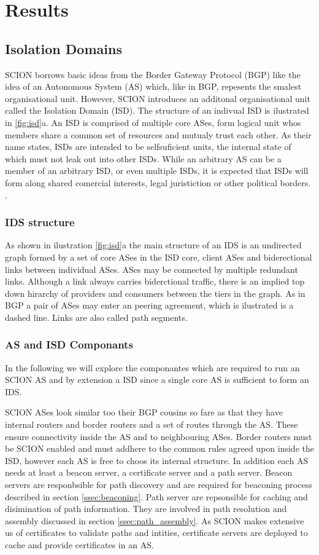 \documentclass[../eva1_scion.tex]{subfiles}
\begin{document}
    \chapter{Results}
    \section{Isolation Domains}
    SCION borrows basic ideas from the Border Gateway Protocol (BGP) like the idea of an Autonomous System (AS) which, like in BGP, repesents the smalest organisational unit. However, SCION introduces an additonal organisational unit called the Isolation Domain (ISD). The structure of an indivual ISD is ilustrated in \ref{fig:isd}a. An ISD is comprised of multiple core ASes, form logical unit whos members share a common set of resources and mutualy trust each other. As their name states, ISDs are intended to be selfsuficient units, the internal state of which must not leak out into other ISDs. \cite{scion_2011} While an arbitrary AS can be a member of an arbitrary ISD, or even multiple ISDs, it is expected that ISDs will form along shared comercial interests, legal juristiction or other political borders. \cite{scion_2017}.

    \subsection{IDS structure}
    As shown in ilustration \ref{fig:isd}a the main structure of an IDS is an undirected graph formed by a set of core ASes in the ISD core, client ASes and biderectional links between individual ASes. ASes may be connected by multiple redundant links. Although a link always carries biderctional traffic, there is an implied top down hirarchy of providers and consumers between the tiers in the graph. As in BGP a pair of ASes may enter an peering agreement, which is ilustrated is a dashed line. Links are also called path segments.

    \subsection{AS and ISD Componants}
    In the following we will explore the componantes which are required to run an SCION AS and by extension a ISD since a single core AS is sufficient to form an IDS.

    SCION ASes look similar too their BGP cousins so fare as that they have internal routers and border routers and a set of routes through the AS. These ensure connectivity inside the AS and to neighbouring ASes. Border routers must be SCION enabled and must addhere to the common rules agreed upon inside the ISD, however each AS is free to choos its internal structure. In addition each AS needs at least a beacon server, a certificate server and a path server. Beacon servers are responbsible for path discovery and are required for beaconing process described in section \ref{ssec:beaconing}. Path server are repsonsible for caching and disimination of path information. They are involved in path resolution and assembly discussed in section \ref{ssec:path_assembly}. As SCION makes extensive us of certificates to validate paths and intities, certificate servers are deployed to cache and provide certificates in an AS.
    
\end{document}
